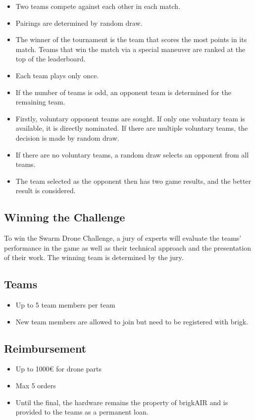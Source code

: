 \begin{itemize}
\item Two teams compete against each other in each match.
\item Pairings are determined by random draw.
\item The winner of the tournament is the team that scores the most points in its match. Teams that win the match via a special maneuver are ranked at the top of the leaderboard.
\item Each team plays only once.
\item If the number of teams is odd, an opponent team is determined for the remaining team.
\item Firstly, voluntary opponent teams are sought. If only one voluntary team is available, it is directly nominated. If there are multiple voluntary teams, the decision is made by random draw.
\item If there are no voluntary teams, a random draw selects an opponent from all teams.
\item The team selected as the opponent then has two game results, and the better result is considered.
\end{itemize}


\subsection{Winning the Challenge}
To win the Swarm Drone Challenge, a jury of experts will evaluate the teams' performance in the game as well as their technical approach and the presentation of their work. The winning team is determined by the jury.

\subsection{Teams}
\begin{itemize}
	\item{Up to 5 team members per team}
	\item{New team members are allowed to join but need to be registered with brigk.}
\end{itemize}

\subsection{Reimbursement}
\begin{itemize}
	\item Up to 1000€ for drone parts 
	\item Max 5 orders 
	\item Until the final, the hardware remains the property of brigkAIR and is provided to the teams as a permanent loan.

\end{itemize}

